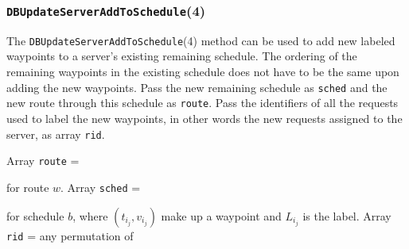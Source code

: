\documentclass{article}
\theoremstyle{definition}                   %
\begin{document}
\subsubsection{{\tt{}\protect{}DBUpdateServerAddToSchedule}(4)}
The {\tt{}\protect{}DBUpdateServerAddToSchedule}(4) method can be used to add new labeled
waypoints to a server's existing remaining schedule. The ordering of the
remaining waypoints in the existing schedule does not have to be the same
upon adding the new waypoints. Pass the new remaining schedule as {\tt{}sched} and
the new route through this schedule as {\tt{}route}. Pass the identifiers of all
the requests used to label the new waypoints, in other words the new
requests assigned to the server, as array {\tt{}rid}.

Array {\tt{}route} =

\noindent
{}

\noindent for route $w$. Array {\tt{}sched} =

\noindent
{}

\noindent for schedule $b$, where $(t_{i_j},v_{i_j})$ make up a waypoint and
$L_{i_j}$ is the label. Array {\tt{}rid} = any permutation of

\noindent
{}
\end{document}
